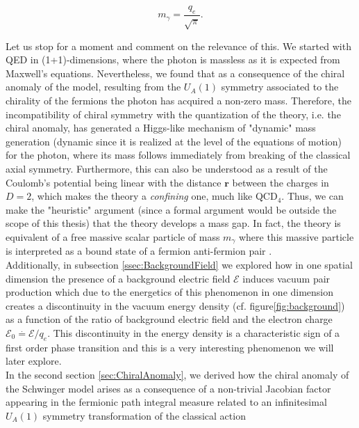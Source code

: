  \begin{equation*}
 	m_\gamma =\frac{q_e}{\sqrt{\pi}}.
 \end{equation*}
 
 Let us stop for a moment and comment on the relevance of this. We started with QED in (1+1)-dimensions, where the photon is massless as it is expected from Maxwell's equations. Nevertheless, we found that as a consequence of the chiral anomaly of the model, resulting from the $U_A(1)$ symmetry associated to the chirality of the fermions the photon has acquired a non-zero mass. Therefore, the incompatibility of chiral symmetry with the quantization of the theory, i.e. the chiral anomaly, has generated a Higgs-like mechanism of "dynamic" mass generation  (dynamic since it is realized at the level of the equations of motion) for the photon, where its mass follows immediately from breaking of the classical axial symmetry. Furthermore, this can also be understood as a result of the Coulomb's potential being linear with the distance $\pmb{r}$ between the charges in $D=2$, which makes the theory a \emph{confining} one, much like QCD$_4$. Thus, we can make the "heuristic" argument (since a formal argument would be outside the scope of this thesis) that the theory develops a mass gap. In fact, the theory is equivalent of a free massive scalar particle of mass $m_\gamma$ where this massive particle is interpreted as a bound state of a fermion anti-fermion pair \cite{Lowenstein1971}.\\
 
 Additionally, in subsection \ref{ssec:BackgroundField} we explored how in one spatial dimension the presence of a background electric field $\mathcal{E}$ induces vacuum pair production which due to the energetics of this phenomenon in one dimension creates a discontinuity in the vacuum energy density (cf. figure\ref{fig:background}) as a function of the ratio of background electric field and the electron charge $\mathcal{E}_0\overset{.}{=}\mathcal{E}/q_e$. This discontinuity in the energy density is a characteristic sign of a first order phase transition and this is a very interesting phenomenon we will later explore.\\
 
 In the second section \ref{sec:ChiralAnomaly}, we derived how the chiral anomaly of the Schwinger model arises as a consequence of a non-trivial Jacobian factor appearing in the fermionic path integral measure related to an infinitesimal $U_A(1)$ symmetry transformation of the classical action
 
